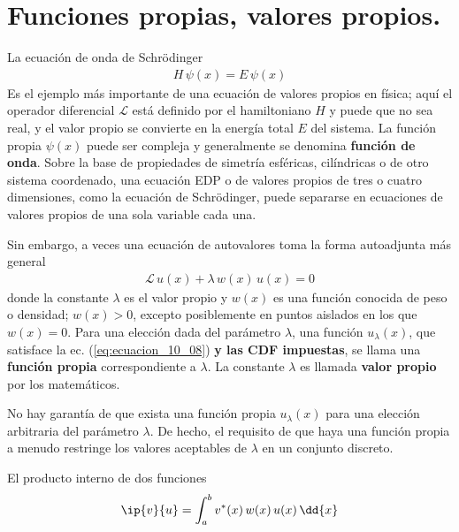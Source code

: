 \section{Funciones propias, valores propios.}
La ecuación de onda de Schrödinger
\begin{align*}
H \, \psi (x) = E \, \psi (x)
\end{align*}
Es el ejemplo más importante de una ecuación de valores propios en física; aquí el operador diferencial $\mathcal{L}$ está definido por el hamiltoniano $H$ y puede que no sea real, y el valor propio se convierte en la energía total $E$ del sistema. La función propia $\psi (x)$ puede ser compleja y generalmente se denomina \textbf{función de onda}. Sobre la base de propiedades de simetría esféricas, cilíndricas o de otro sistema coordenado, una ecuación EDP o de valores propios de tres o cuatro dimensiones, como la ecuación de Schrödinger, puede separarse en ecuaciones de valores propios de una sola variable cada una.
\par
Sin embargo, a veces una ecuación de autovalores toma la forma autoadjunta más general
\begin{align}
\mathcal{L} \, u(x) + \lambda \, w(x) \, u(x) = 0
\label{eq:ecuacion_10_08}
\end{align}
donde la constante $\lambda$ es el valor propio y $w(x)$ es una función conocida de peso o densidad; $w(x) > 0$, excepto posiblemente en puntos aislados en los que $w(x) = 0$. Para una elección dada del parámetro $\lambda$, una función $u_{\lambda}(x)$, que satisface la ec. (\ref{eq:ecuacion_10_08}) \textbf{y las CDF impuestas}, se llama una \textbf{función propia} correspondiente a $\lambda$. La constante $\lambda$ es llamada \textbf{valor propio} por los matemáticos.
\par
No hay garantía de que exista una función propia $u_{\lambda} (x)$ para una elección arbitraria del parámetro $\lambda$. De hecho, el requisito de que haya una función propia a menudo restringe los valores aceptables de $\lambda$ en un conjunto discreto. 
\par
El producto interno de dos funciones
\begin{align*}
\ip{v}{u} = \int_{a}^{b} v^{*}(x) \, w(x) \, u(x) \, \dd{x}
\end{align*}

